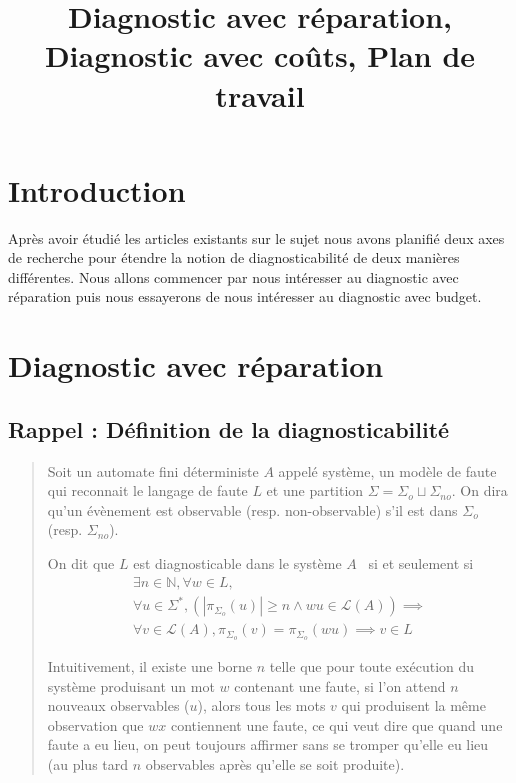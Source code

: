\documentclass[a4paper,10pt]{article}
\title{Diagnostic avec réparation, Diagnostic avec co\^uts, Plan de travail}
\date{}
\begin{document}
\maketitle

\section*{Introduction}

Après avoir étudié les articles existants sur le sujet nous avons planifié deux axes de recherche pour étendre la notion de diagnosticabilité de deux manières différentes. Nous allons commencer par nous intéresser au diagnostic avec réparation puis nous essayerons de nous intéresser au diagnostic avec budget.

\section{Diagnostic avec r\'eparation}
\subsection{Rappel : Définition de la diagnosticabilité}
\begin{quote}
Soit un automate fini d\'eterministe $A$ appel\'e syst\`eme, un modèle de faute qui reconnait le langage de faute $L$ et une partition $\Sigma=\Sigma_o\sqcup \Sigma_{no}$. On dira qu'un \'ev\`enement est observable (resp. non-observable) s'il est dans $\Sigma_o$ (resp. $\Sigma_{no}$).

On dit que $L$ est diagnosticable dans le système $A$~\cite{SamSRST96}  si et seulement si $$\begin{array}{l}
\exists n \in \mathbb N, \forall w \in L,\\
\forall u \in \Sigma^*, \left(\left|\pi_{\Sigma_o}(u)\right|\ge n \land wu \in \mathcal L(A)\right) \implies\\
\forall v \in \mathcal L(A), \pi_{\Sigma_o}(v)=\pi_{\Sigma_o}(wu) \implies v \in L
\end{array}$$

Intuitivement, il existe une borne $n$ telle que pour toute ex\'ecution du système produisant un mot $w$ contenant une faute, si l'on attend $n$ nouveaux observables ($u$), alors tous les mots $v$ qui produisent la m\^eme observation que $wx$ contiennent une faute, ce qui veut dire que quand une faute a eu lieu, on peut toujours affirmer sans se tromper qu'elle eu lieu (au plus tard $n$ observables après qu'elle se soit produite).
\end{quote}
\end{document}
